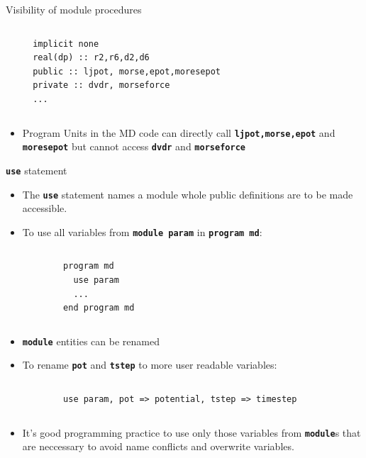 \documentclass[slidestop,mathserif,compress,xcolor=svgnames]{beamer}
\newenvironment{eblock}[0]
{
\begin{beamerboxesrounded}[upper=uppercol2,lower=lowercol2,shadow=true]}
{\end{beamerboxesrounded}}
\begin{document}
\begin{frame}
\begin{block}{\scriptsize Visibility of module procedures}
\begin{itemize}
\begin{columns}
\begin{eblock}{}
{\begin{verbatim}
  implicit none
  real(dp) :: r2,r6,d2,d6
  public :: ljpot, morse,epot,moresepot
  private :: dvdr, morseforce
  ...
          \end{verbatim}
          }
        \end{eblock}
      \end{columns}
    \item Program Units in the MD code can directly call \textbf{\texttt{ljpot,morse,epot}} and \textbf{\texttt{moresepot}} but cannot access \textbf{\texttt{dvdr}} and \textbf{\texttt{morseforce}}
    \end{itemize}
  \end{block}
  \begin{block}{\scriptsize \textbf{\texttt{use}} statement}
    \begin{itemize}
      \item The \textbf{\texttt{use}} statement names a module whole public definitions are to be made accessible.
      \item[] To use all variables from \textbf{\texttt{module param}} in \textbf{\texttt{program md}}:
      {\fontsize{4}{5}
        \begin{columns}
          \column{5cm}
          \begin{eblock}{}
            \begin{verbatim}
        program md
          use param
          ...
        end program md
            \end{verbatim}
          \end{eblock}
        \end{columns}
      }
      \item \textbf{\texttt{module}} entities can be renamed
      \item[] To rename \textbf{\texttt{pot}} and \textbf{\texttt{tstep}} to more user readable variables:
      {\fontsize{4}{5}
        \begin{columns}
          \column{5cm}
          \begin{eblock}{}
            \begin{verbatim}
        use param, pot => potential, tstep => timestep
            \end{verbatim}
          \end{eblock}
        \end{columns}
      }
      \item It's good programming practice to use only those variables from \textbf{\texttt{module}}s that are neccessary to avoid name conflicts and overwrite variables.

\end{itemize}
\end{block}
\end{frame}
\end{document}
